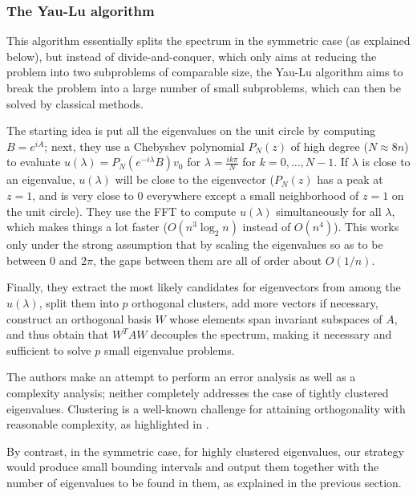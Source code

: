 \documentclass{article}
\theoremstyle{definition}
\begin{document}
\subsubsection{The Yau-Lu algorithm}

This algorithm essentially splits the spectrum in the symmetric case (as explained below), but instead of divide-and-conquer, which only aims at reducing the problem into two subproblems of comparable size, the Yau-Lu algorithm aims to break the problem into a large number of small subproblems, which can then be solved by classical methods. 

 The starting idea is put all the eigenvalues on the unit circle by computing $B = e^{iA}$; next, they use a Chebyshev polynomial $P_N(z)$ of high degree ($N \approx 8n$) to evaluate $u(\lambda) = P_N(e^{-i \lambda}B)v_0$ for $\lambda = \frac{i k \pi}{N}$ for  $k = 0, \ldots, N-1$. If  $\lambda$ is close to an eigenvalue, $u(\lambda)$ will be  close to the eigenvector ($P_N(z)$ has a peak at $z=1$, and is very close to $0$  everywhere except a small neighborhood of $z=1$ on the unit circle).  They use the FFT to compute $u(\lambda)$ simultaneously for all $\lambda$,  which makes things a lot faster ($O(n^3\log_2n)$ instead of $O(n^4)$). This works only under the strong assumption that by scaling the eigenvalues so as to be between $0$ and $2\pi$, the gaps between them are all of order about $O(1/n)$. 

Finally, they extract the most likely candidates for eigenvectors from among the $u(\lambda)$, split them into $p$ orthogonal clusters, add more vectors if necessary, construct an orthogonal basis $W$ whose elements span invariant subspaces of $A$, and thus obtain that $W^{T}AW$ decouples the spectrum, making it necessary and sufficient to solve $p$ small eigenvalue problems. 

The authors make an attempt to perform an error analysis as well as a complexity analysis; neither completely addresses the case of tightly clustered eigenvalues. Clustering is a well-known challenge for attaining orthogonality with reasonable complexity, as highlighted in \cite{PD06,DPV06}.

By contrast, in the symmetric case, for highly clustered eigenvalues, our strategy would produce small bounding intervals and output them together with the number of eigenvalues to be found in them, as explained in the previous section. 
\end{document}
